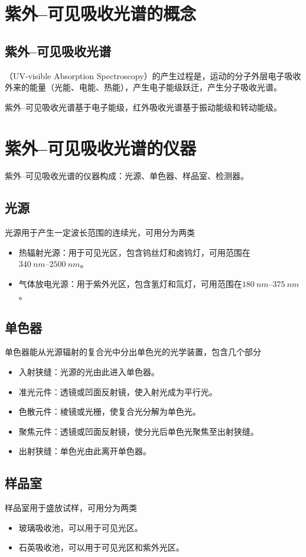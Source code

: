 \section{紫外--可见吸收光谱的概念}

\subsection{紫外--可见吸收光谱}
（UV-visible Absorption Spectroscopy）的产生过程是，运动的分子外层电子吸收外来的能量（光能、电能、热能），产生电子能级跃迁，产生分子吸收光谱。

紫外--可见吸收光谱基于电子能级，红外吸收光谱基于振动能级和转动能级。

\section{紫外--可见吸收光谱的仪器}
紫外--可见吸收光谱的仪器构成：光源、单色器、样品室、检测器。

\subsection{光源}
光源用于产生一定波长范围的连续光，可用分为两类
\begin{itemize}
    \item 热辐射光源：用于可见光区，包含钨丝灯和卤钨灯，可用范围在$\SIrange{340}{2500}{nm}$。
    \item 气体放电光源：用于紫外光区，包含氢灯和氚灯，可用范围在$\SIrange{180}{375}{nm}$。
\end{itemize}

\subsection{单色器}
单色器能从光源辐射的复合光中分出单色光的光学装置，包含几个部分
\begin{itemize}
    \item 入射狭缝：光源的光由此进入单色器。
    \item 准光元件：透镜或凹面反射镜，使入射光成为平行光。
    \item 色散元件：棱镜或光栅，使复合光分解为单色光。
    \item 聚焦元件：透镜或凹面反射镜，使分光后单色光聚焦至出射狭缝。
    \item 出射狭缝：单色光由此离开单色器。
\end{itemize}

\subsection{样品室}
样品室用于盛放试样，可用分为两类
\begin{itemize}
    \item 玻璃吸收池，可以用于可见光区。
    \item 石英吸收池，可以用于可见光区和紫外光区。
\end{itemize}

